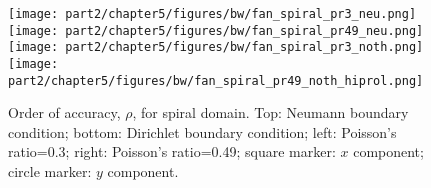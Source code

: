 \begin{figure}[h!]\centering
\texttt{[image: part2/chapter5/figures/bw/fan\_spiral\_pr3\_neu.png]}
\texttt{[image: part2/chapter5/figures/bw/fan\_spiral\_pr49\_neu.png]}
\texttt{[image: part2/chapter5/figures/bw/fan\_spiral\_pr3\_noth.png]}
\texttt{[image: part2/chapter5/figures/bw/fan\_spiral\_pr49\_noth\_hiprol.png]}
\vspace*{-.05in}
\caption{Order of accuracy, $\rho$, for spiral domain. Top: Neumann boundary condition; bottom: Dirichlet boundary condition; left: Poisson's ratio=0.3; right: Poisson's ratio=0.49; square marker: $x$ component; circle marker: $y$ component. }
\vspace*{-.07in}
\label{fan_spiral_noth}
\end{figure}

